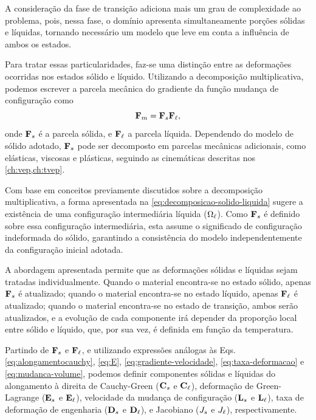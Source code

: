 \documentclass[Tese.tex]{subfiles}
\begin{document}
A consideração da fase de transição adiciona mais um grau de complexidade ao problema, pois, nessa fase, o domínio apresenta simultaneamente porções sólidas e líquidas, tornando necessário um modelo que leve em conta a influência de ambos os estados.

Para tratar essas particularidades, faz-se uma distinção entre as deformações ocorridas nos estados sólido e líquido. Utilizando a decomposição multiplicativa, podemos escrever a parcela mecânica do gradiente da função mudança de configuração como
\begin{equation}\label{eq:decomposicao-solido-liquida}
\mathbf{F}_m = \mathbf{F}_s\mathbf{F}_\ell,
\end{equation}
onde $\mathbf{F}_s$ é a parcela sólida, e $\mathbf{F}_\ell$ a parcela líquida. Dependendo do modelo de sólido adotado, $\mathbf{F}_s$ pode ser decomposto em parcelas mecânicas adicionais, como elásticas, viscosas e plásticas, seguindo as cinemáticas descritas nos \cref{ch:vep,ch:tvep}.

Com base em conceitos previamente discutidos sobre a decomposição multiplicativa, a forma apresentada na \cref{eq:decomposicao-solido-liquida} sugere a existência de uma configuração intermediária líquida ($\Omega_\ell$). Como $\mathbf{F}_s$ é definido sobre essa configuração intermediária, esta assume o significado de configuração indeformada do sólido, garantindo a consistência do modelo independentemente da configuração inicial adotada.

A abordagem apresentada permite que as deformações sólidas e líquidas sejam tratadas individualmente. Quando o material encontra-se no estado sólido, apenas $\mathbf{F}_s$ é atualizado; quando o material encontra-se no estado líquido, apenas $\mathbf{F}_\ell$ é atualizado; quando o material encontra-se no estado de transição, ambos serão atualizados, e a evolução de cada componente irá depender da proporção local entre sólido e líquido, que, por sua vez, é definida em função da temperatura.

Partindo de $\mathbf{F}_s$ e $\mathbf{F}_\ell$, e utilizando expressões análogas às Eqs. \eqref{eq:alongamentocauchy}, \eqref{eq:E}, \eqref{eq:gradiente-velocidade}, \eqref{eq:taxa-deformacao} e \eqref{eq:mudanca-volume}, podemos definir componentes sólidas e líquidas do alongamento à direita de Cauchy-Green ($\mathbf{C}_s$ e $\mathbf{C}_\ell$), deformação de Green-Lagrange ($\mathbf{E}_s$ e $\mathbf{E}_\ell$), velocidade da mudança de configuração ($\mathbf{L}_s$ e $\mathbf{L}_\ell$), taxa de deformação de engenharia ($\mathbf{D}_s$ e $\mathbf{D}_\ell$), e Jacobiano ($J_s$ e $J_\ell$), respectivamente. 
\end{document}
